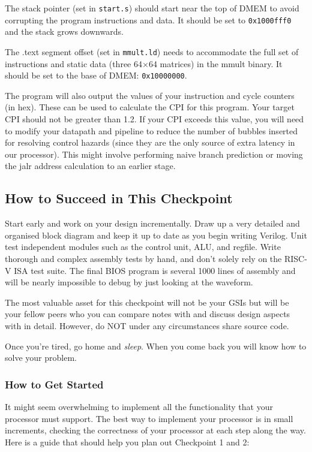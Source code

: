 \documentclass[11pt]{article}
\begin{document}
The stack pointer (set in \verb|start.s|) should start near the top of DMEM to avoid corrupting the program instructions and data.
It should be set to \verb|0x1000fff0| and the stack grows downwards.

The .text segment offset (set in \verb|mmult.ld|) needs to accommodate the full set of instructions and static data (three 64$\times$64 matrices) in the mmult binary.
It should be set to the base of DMEM: \verb|0x10000000|.

The program will also output the values of your instruction and cycle counters (in hex).
These can be used to calculate the CPI for this program.
Your target CPI should not be greater than 1.2.
If your CPI exceeds this value, you will need to modify your datapath and pipeline to reduce the number of bubbles inserted for resolving control hazards (since they are the only source of extra latency in our processor).
This might involve performing naive branch prediction or moving the jalr address calculation to an earlier stage.

\subsection{How to Succeed in This Checkpoint}
Start early and work on your design incrementally.
Draw up a very detailed and organised block diagram and keep it up to date as you begin writing Verilog.
Unit test independent modules such as the control unit, ALU, and regfile.
Write thorough and complex assembly tests by hand, and don't solely rely on the RISC-V ISA test suite.
The final BIOS program is several 1000 lines of assembly and will be nearly impossible to debug by just looking at the waveform.

The most valuable asset for this checkpoint will not be your GSIs but will be your fellow peers who you can compare notes with and discuss design aspects with in detail.
However, do NOT under any circumstances share source code.

Once you're tired, go home and \textit{sleep}. When you come back you will know how to solve your problem.

\subsubsection{How to Get Started}
It might seem overwhelming to implement all the functionality that your processor must support. The best way to implement your processor is in small increments, checking the correctness of your processor at each step along the way. Here is a guide that should help you plan out Checkpoint 1 and 2:
\end{document}
